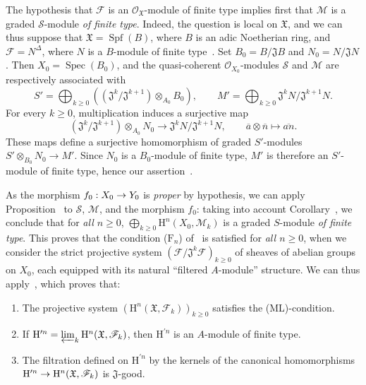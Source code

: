 \documentclass[oneside]{amsart}
\theoremstyle{ega-env-style}
\theoremstyle{ega-thm-env-style}
\theoremstyle{ega-defn-env-style}
\def\mathcal{\mathscr}
\def\sh{\mathcal}                   %
\def\geq{\geqslant}                 %
\def\HH{\mathrm{H}}                 %
\def\Spec{\operatorname{Spec}}
\def\Spf{\operatorname{Spf}}
\renewcommand{\to}{\mathchoice{\longrightarrow}{\rightarrow}{\rightarrow}{\rightarrow}}
\newcommand{\oldpage}[2][]{{\marginnote{\normalfont{\textbf{#1}~|~#2}}}\ignorespaces}
\begin{document}
The hypothesis that $\sh{F}$ is an $\sh{O}_\mathfrak{X}$-module of finite type implies first that $\sh{M}$ is
\oldpage[III]{121}
a graded $\sh{S}$-module \emph{of finite type}.
Indeed, the question is local on $\mathfrak{X}$, and we can thus suppose that $\mathfrak{X}=\Spf(B)$, where $B$ is an adic Noetherian ring, and $\sh{F}=N^\Delta$, where $N$ is a $B$-module of finite type~.
Set $B_0=B/\mathfrak{J}B$ and $N_0=N/\mathfrak{J}N$.
Then $X_0=\Spec(B_0)$, and the quasi-coherent $\sh{O}_{X_0}$-modules $\sh{S}$ and $\sh{M}$ are respectively associated with
\[
  S'=\bigoplus_{k\geq 0}((\mathfrak{J}^k/\mathfrak{J}^{k+1})\otimes_{A_0}B_0),\qquad
  M'=\bigoplus_{k\geq 0}\mathfrak{J}^kN/\mathfrak{J}^{k+1}N.
\]
For every $k\geq 0$, multiplication induces a surjective map
\[
  (\mathfrak{J}^k/\mathfrak{J}^{k+1})\otimes_{A_0}N_0
  \longrightarrow\mathfrak{J}^kN/\mathfrak{J}^{k+1}N,
  \qquad \overline a\otimes\overline n\longmapsto\overline{an}.
\]
These maps define a surjective homomorphism of graded $S'$-modules $S'\otimes_{B_0}N_0\longrightarrow M'$.
Since $N_0$ is a $B_0$-module of finite type, $M'$ is therefore an $S'$-module of finite type, hence our assertion~.

As the morphism $f_0:X_0\to Y_0$ is \emph{proper} by hypothesis, we can apply Proposition~ to $\sh{S}$, $\sh{M}$, and the morphism $f_0$: taking into account Corollary~, we conclude that for \emph{all $n\geq 0$}, $\bigoplus_{k\geq 0}\HH^n(X_0,\sh{M}_k)$ is a graded $S$-module \emph{of finite type}.
This proves that the condition ($\text{F}_n$) of~ is satisfied for \emph{all $n\geq 0$}, when we consider the strict projective system $(\sh{F}/\mathfrak{J}^k\sh{F})_{k\geq 0}$ of sheaves of abelian groups on $X_0$, each equipped with its natural ``filtered $A$-module'' structure.
We can thus apply~, which proves that:
\begin{enumerate}
  \item[1st.] The projective system $(\HH^n(\mathfrak{X},\sh{F}_k))_{k\geq 0}$ satisfies the (ML)-condition.
  \item[2nd.] If $\HH^{\prime n}=\varprojlim_k\HH^n(\mathfrak{X},\sh{F}_k)$, then $\HH^{\prime n}$ is an $A$-module of finite type.
  \item[3rd.] The filtration defined on $\HH^{\prime n}$ by the kernels of the canonical homomorphisms $\HH^{\prime n}\to\HH^n(\mathfrak{X},\sh{F}_k)$ is $\mathfrak{J}$-good.
\end{enumerate}
\end{document}
